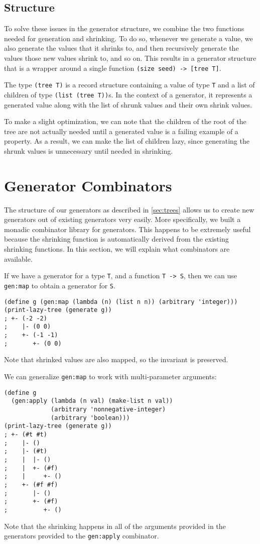 \documentclass{scrartcl}
\begin{document}
\subsection{Structure}
To solve these issues in the generator structure,
we combine the two functions needed for generation and shrinking.
To do so, whenever we generate a value,
we also generate the values that it shrinks to,
and then recursively generate the values those new values shrink to, and so on.
This results in a generator structure that is a wrapper around a single
function \verb|(size seed) -> [tree T]|.

The type \verb|(tree T)| is a record structure containing
  a value of type \verb|T| and
  a list of children of type \verb|(list (tree T))|s.
In the context of a generator, it represents
  a generated value
  along with the list of shrunk values and their own shrink values.

To make a slight optimization, we can note that the children of the root
of the tree are not actually needed until a generated value is
a failing example of a property.
As a result, we can make the list of children lazy,
since generating the shrunk values is unnecessary until needed in shrinking.


\section{Generator Combinators}

The structure of our generators as described in \ref{sec:trees} allows us to
create new generators out of existing generators very easily.
More specifically, we built a monadic combinator library for generators.
This happens to be extremely useful because the shrinking function is
automatically derived from the existing shrinking functions.
In this section, we will explain what combinators are available.

If we have a generator for a type \verb|T|, and a function \verb|T -> S|,
then we can use \verb|gen:map| to obtain a generator for \verb|S|.
\begin{verbatim}
(define g (gen:map (lambda (n) (list n n)) (arbitrary 'integer)))
(print-lazy-tree (generate g))
; +- (-2 -2)
;    |- (0 0)
;    +- (-1 -1)
;       +- (0 0)
\end{verbatim}
Note that shrinked values are also mapped, so the invariant is preserved.

We can generalize \verb|gen:map| to work with multi-parameter arguments:
\begin{verbatim}
(define g
  (gen:apply (lambda (n val) (make-list n val))
             (arbitrary 'nonnegative-integer)
             (arbitrary 'boolean)))
(print-lazy-tree (generate g))
; +- (#t #t)
;    |- ()
;    |- (#t)
;    |  |- ()
;    |  +- (#f)
;    |     +- ()
;    +- (#f #f)
;       |- ()
;       +- (#f)
;          +- ()
\end{verbatim}
Note that the shrinking happens in all of the arguments provided in the
generators provided to the \verb|gen:apply| combinator.
\end{document}
